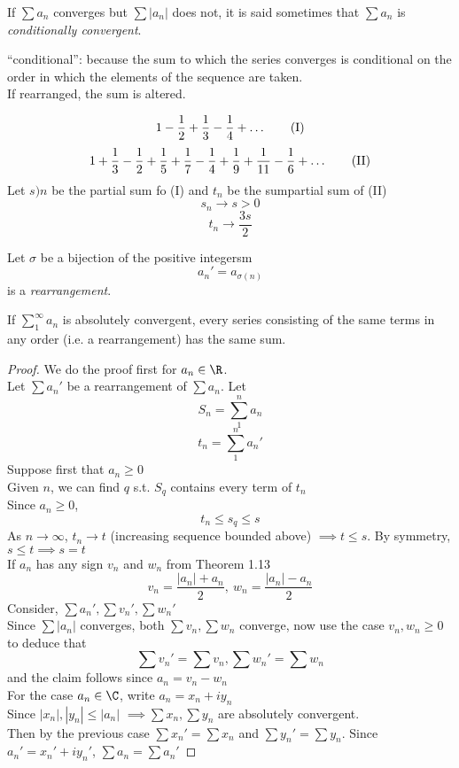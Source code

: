\begin{definition}
If $\sum a_n$ converges but $\sum |a_n|$ does not, it is said sometimes that $\sum a_n$ is \emph{conditionally convergent}.
\begin{note}
``conditional'': because the sum to which the series converges is conditional on the order in which the elements of the sequence are taken.\\
If rearranged, the sum is altered.
\end{note}
\end{definition}
\begin{example}
\[1-\frac{1}{2} + \frac{1}{3} - \frac{1}{4} + \dots\tag{\text{I}}\]
\[1 + \frac{1}{3} - \frac{1}{2} + \frac{1}{5} + \frac{1}{7} -\frac{1}{4} + \frac{1}{9} + \frac{1}{11} - \frac{1}{6}+\dots\tag{\text{II}}\]
Let $s)n$ be the partial sum fo (I) and $t_n$ be the sumpartial sum of (II)\\
\[s_n \to s > 0\]
\[t_n \to \frac{3s}{2}\]
\end{example}
\begin{definition}
Let $\sigma$ be a bijection of the positive integersm
\[a_n' = a_{\sigma(n)}\]
is a \emph{rearrangement}.
\end{definition}
\begin{theorem}
If $\sum_1^{\infty} a_n$ is absolutely convergent, every series consisting of the same terms in any order (i.e. a rearrangement) has the same sum.
\begin{proof}
We do the proof first for $a_n\in \R$.\\
Let $\sum a_n'$ be a rearrangement of $\sum a_n$. Let \[S_n=\sum_1^n a_n\]
\[t_n = \sum_1^n a_n'\]
Suppose first that $a_n\geq 0$\\
Given $n$, we can find $q$ s.t. $S_q$ contains every term of $t_n$\\
Since $a_n \geq 0$,
\[t_n \leq s_q \leq s\]
As $n\to \infty$, $t_n \to t$ (increasing sequence bounded above) $\implies t \leq s$.
By symmetry, $s\leq t \implies s = t$\\
If $a_n$ has any sign $v_n$ and $w_n$ from Theorem 1.13
\[v_n = \frac{|a_n| + a_n}{2}, \ w_n = \frac{|a_n| - a_n}{2}\]
Consider, $\sum a_n',\sum v_n',\sum w_n'$\\
Since $\sum|a_n|$ converges, both $\sum v_n, \sum w_n$ converge, now use the case $v_n, w_n \geq 0$ to deduce that
\[\sum v_n' = \sum v_n, \sum w_n' = \sum w_n\]
and the claim follows since $a_n = v_n - w_n$\\
For the case $a_n \in \C$, write $a_n = x_n + iy_n$\\
Since $|x_n|, |y_n| \leq |a_n|$
$\implies \sum x_n, \sum y_n$ are absolutely convergent.\\
Then by the previous case $\sum x_n' = \sum x_n$ and $\sum y_n' = \sum y_n$. Since $a_n' = x_n' + iy_n'$, $\sum a_n = \sum a_n'$
\end{proof}
\end{theorem}
